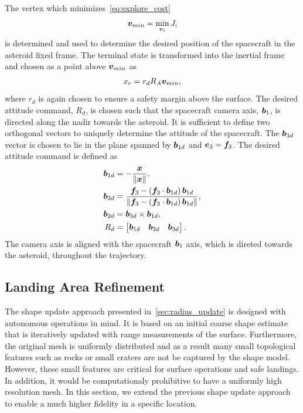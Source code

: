 The vertex which minimizes~\cref{eq:explore_cost} 
\begin{align*}
    \bm{v}_{min} = \min_{\bm{v}_i} J,
\end{align*}
is determined and used to determine the desired position of the spacecraft in the asteroid fixed frame.
The terminal state is transformed into the inertial frame and chosen as a point above \( \bm{v}_{min} \) as
\begin{align}
    x_r = r_d R_A \bm{v}_{min}, 
\end{align}
where \( r_d \) is again chosen to ensure a safety margin above the surface.
The desired attitude command, \( R_d\), is chosen such that the spacecraft camera axis, \( \bm{b}_1 \), is directed along the nadir towards the asteroid.
It is sufficient to define two orthogonal vectors to uniquely determine the attitude of the spacecraft.
The \( \bm{b}_{3d} \) vector is chosen to lie in the plane spanned by \(\bm{b}_{1d} \) and \( \bm{e}_3 = \bm{f}_3 \).
The desired attitude command is defined as
\begin{align}
    \bm{b}_{1d} &= - \frac{\bm{x}}{\left\| \bm{x} \right\|} , \\
    \bm{b}_{3d} &= \frac{\bm{f}_3 - \left( \bm{f}_3 \cdot \bm{b}_{1d} \right) \bm{b}_{1d}}{\left\| \bm{f}_3 - \left( \bm{f}_3 \cdot \bm{b}_{1d} \right) \bm{b}_{1d} \right\|}, \\
    \bm{b}_{2d} &= \bm{b}_{3d} \times \bm{b}_{1d} , \\
R_d &= \begin{bmatrix} \bm{b}_{1d} & \bm{b}_{2d} & \bm{b}_{3d} \end{bmatrix} .
\end{align}
The camera axis is aligned with the spacecraft \( \bm{b}_ 1 \) axis, which is direted towards the asteroid, throughout the trajectory.

\subsection{Landing Area Refinement}\label{sec:landing_refinement}
The shape update approach presented in~\cref{sec:radius_update} is designed with autonomous operations in mind. 
It is based on an initial coarse shape estimate that is iteratively updated with range measurements of the surface.
Furthermore, the original mesh is uniformly distributed and as a result many small topological features such as rocks or small craters are not be captured by the shape model. 
However, these small features are critical for surface operations and safe landings.
In addition, it would be computationaly prohibitive to have a uniformly high resolution mesh.
In this section, we extend the previous shape update approach to enable a much higher fidelity in a specific location.

